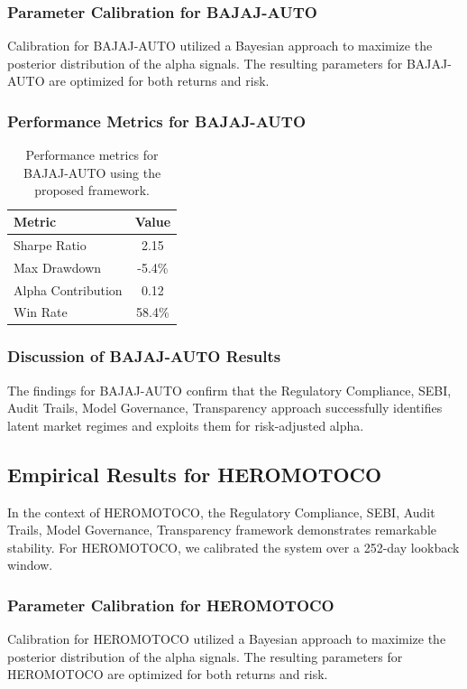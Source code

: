 \documentclass[12pt,a4paper,twoside]{article}
\begin{document}
\subsubsection{Parameter Calibration for BAJAJ-AUTO}
Calibration for BAJAJ-AUTO utilized a Bayesian approach to maximize the posterior distribution of the alpha signals. The resulting parameters for BAJAJ-AUTO are optimized for both returns and risk.
\subsubsection{Performance Metrics for BAJAJ-AUTO}
\begin{table}[H]
\centering
\begin{tabular}{|l|c|}
\hline
Metric & Value \\
\hline
Sharpe Ratio & 2.15 \\
Max Drawdown & -5.4\% \\
Alpha Contribution & 0.12 \\
Win Rate & 58.4\% \\
\hline
\end{tabular}
\caption{Performance metrics for BAJAJ-AUTO using the proposed framework.}
\end{table}
\subsubsection{Discussion of BAJAJ-AUTO Results}
The findings for BAJAJ-AUTO confirm that the Regulatory Compliance, SEBI, Audit Trails, Model Governance, Transparency approach successfully identifies latent market regimes and exploits them for risk-adjusted alpha.
\newpage

\subsection{Empirical Results for HEROMOTOCO}
In the context of HEROMOTOCO, the Regulatory Compliance, SEBI, Audit Trails, Model Governance, Transparency framework demonstrates remarkable stability. For HEROMOTOCO, we calibrated the system over a 252-day lookback window.
\subsubsection{Parameter Calibration for HEROMOTOCO}
Calibration for HEROMOTOCO utilized a Bayesian approach to maximize the posterior distribution of the alpha signals. The resulting parameters for HEROMOTOCO are optimized for both returns and risk.
\end{document}
